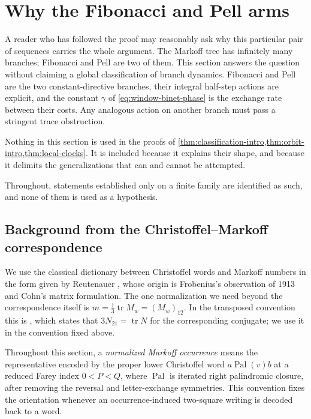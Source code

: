 %
%
\section{Why the Fibonacci and Pell arms}
\label{sec:two-arms}

A reader who has followed the proof may reasonably ask why this particular
pair of sequences carries the whole argument. The Markoff tree has
infinitely many branches; Fibonacci and Pell are two of them. This section
answers the question without claiming a global classification of branch
dynamics. Fibonacci and Pell are the two constant-directive branches, their
integral half-step actions are explicit, and the constant $\gamma$ of
\cref{eq:window-binet-phase} is the exchange rate between their costs. Any
analogous action on another branch must pass a stringent trace obstruction.

Nothing in this section is used in the proofs of
\cref{thm:classification-intro,thm:orbit-intro,thm:local-clocks}. It is
included because it explains their shape, and because it delimits the
generalizations that can and cannot be attempted.

Throughout, statements established only on a finite family are identified
as such, and none of them is used as a hypothesis.

\subsection{Background from the Christoffel--Markoff correspondence}

We use the classical dictionary between Christoffel words and Markoff
numbers in the form given by Reutenauer \cite{Reutenauer2026}, whose origin is
Frobenius's observation of 1913 \cite{Frobenius1913} and Cohn's matrix
formulation. The one normalization we need beyond the correspondence itself is
$m=\tfrac13\operatorname{tr}M_w=(M_w)_{12}$. In the transposed convention this
is \cite[Lemme~3.2]{Reutenauer2006}, which states that
$3N_{21}=\operatorname{tr}N$ for the corresponding conjugate; we use it in
the convention fixed above.

Throughout this section, a \emph{normalized Markoff occurrence} means the
representative encoded by the proper lower Christoffel word
$a\operatorname{Pal}(v)b$ at a reduced Farey index $0<P<Q$, where
$\operatorname{Pal}$ is iterated right palindromic closure, after removing
the reversal and letter-exchange symmetries. This convention fixes the
orientation whenever an occurrence-induced two-square writing is decoded
back to a word.

